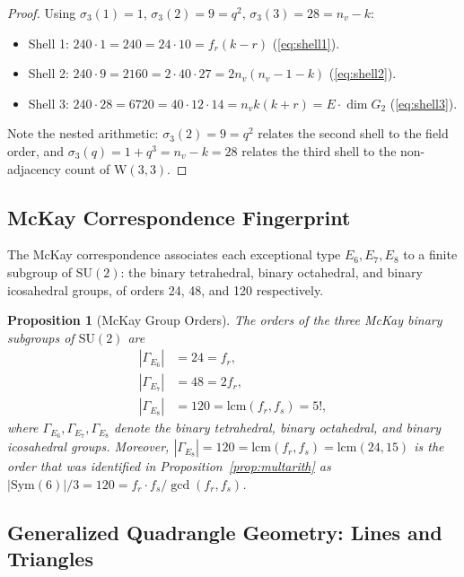 \documentclass[12pt,a4paper]{article}
\newtheorem{proposition}[theorem]{Proposition}
\newcommand{\W}{\mathrm{W}(3,3)}
\newcommand{\nv}{n_{\!v}}
\newcommand{\fr}{f_{\!r}}
\newcommand{\fs}{f_{\!s}}
\begin{document}
\begin{proof}
Using $\sigma_3(1)=1$, $\sigma_3(2)=9=q^2$, $\sigma_3(3)=28=\nv-k$:
\begin{itemize}
  \item Shell 1: $240\cdot 1 = 240 = 24\cdot 10 = \fr(k-r)$ (\ref{eq:shell1}).
  \item Shell 2: $240\cdot 9 = 2160 = 2\cdot 40\cdot 27 = 2\nv(\nv-1-k)$ (\ref{eq:shell2}).
  \item Shell 3: $240\cdot 28 = 6720 = 40\cdot 12\cdot 14 = \nv k(k+r) = E\cdot\dim G_2$ (\ref{eq:shell3}).
\end{itemize}
Note the nested arithmetic:
$\sigma_3(2)=9=q^2$ relates the second shell to the field order,
and $\sigma_3(q)=1+q^3=\nv-k=28$ relates the third shell to the
non-adjacency count of $\W$.
\end{proof}

\subsection{McKay Correspondence Fingerprint}

The McKay correspondence associates each exceptional type $E_6,E_7,E_8$
to a finite subgroup of $\mathrm{SU}(2)$: the binary tetrahedral,
binary octahedral, and binary icosahedral groups, of orders 24, 48,
and 120 respectively.

\begin{proposition}[McKay Group Orders]
\label{prop:mckay}
The orders of the three McKay binary subgroups of $\mathrm{SU}(2)$
are
\begin{align}
  |\Gamma_{E_6}| &= 24 = \fr, \label{eq:mckayE6}\\
  |\Gamma_{E_7}| &= 48 = 2\fr, \label{eq:mckayE7}\\
  |\Gamma_{E_8}| &= 120 = \mathrm{lcm}(\fr,\fs) = 5!, \label{eq:mckayE8}
\end{align}
where $\Gamma_{E_6},\Gamma_{E_7},\Gamma_{E_8}$ denote the binary
tetrahedral, binary octahedral, and binary icosahedral groups.
Moreover, $|\Gamma_{E_8}|=120=\mathrm{lcm}(\fr,\fs)=\mathrm{lcm}(24,15)$
is the order that was identified in Proposition~\ref{prop:multarith}
as $|\mathrm{Sym}(6)|/3=120=\fr\cdot\fs/\gcd(\fr,\fs)$.
\end{proposition}

\subsection{Generalized Quadrangle Geometry: Lines and Triangles}
\end{document}
